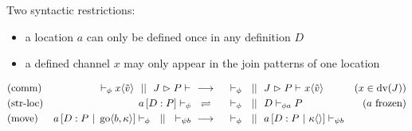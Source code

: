 Two syntactic restrictions:
\begin{itemize}
  \item a location $a$ can only be defined once in any definition $D$
  \item a defined channel $x$ may only appear in the join patterns of one location
\end{itemize}

\begin{align*}
  \chamred{comm}{(x \in \dv{J})}{
    \chamcnf{\phi}{}{\jsnd{x}{\tilde{v}}}
    \champar
    \chamcnf{}{\jrct{J}{P}}{}
  }{
    \chamcnf{\phi}{}{}
    \champar
    \chamcnf{}{\jrct{J}{P}}{\jsnd{x}{\tilde{v}}}
  }
  \\
  \chamequ{str-loc}{(a \ \text{frozen)}}{
    \chamcnf{\phi}{\jloc{a}{D}{P}}{}
  }{
    \chamcnf{\phi}{}{}
    \champar
    \chamcnf{\phi a}{D}{P}
  }
  \\
  \chamred{move}{}{
    \chamcnf{\phi}{\jloc{a}{D}{P \jpar \jgo{b}{\kappa}}}{}
    \champar
    \chamcnf{\psi b}{}{}
  }{
    \chamcnf{\phi}{}{}
    \champar
    \chamcnf{\psi b}{\jloc{a}{D}{P \jpar \jsnd{\kappa}{}}}{}
  }
\end{align*}
